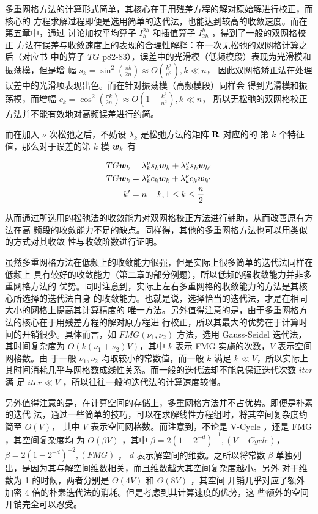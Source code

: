 \documentclass{article}
\begin{document}
多重网格方法的计算形式简单，其核心在于用残差方程的解对原始解进行校正，而核心的
方程求解过程即便是选用简单的迭代法，也能达到较高的收敛速度。而在第五章中，通过
讨论加权平均算子 $I_{h}^{2h}$ 和插值算子 $I_{2h}^{h}$ ，得到了一般的双网格校正
方法在误差与收敛速度上的表现的合理性解释：在一次无松弛的双网格计算之后（对应书
中的算子 $TG$ p82-83），误差中的光滑模（低频模段）表现为光滑模和振荡模，但是增
幅 $s_k = \sin^2 (\frac{\pi k}{2n}) \approx O(\frac{k^2}{n^2}), k \ll n$，
因此双网格矫正法在处理误差中的光滑项表现出色。而在针对振荡模（高频模段）同样会
得到光滑模和振荡模，而增幅
$c_k = \cos^2 (\frac{\pi k}{2n}) \approx O(1-\frac{k^2}{n^2}), k \ll n$，
所以无松弛的双网格校正方法并不能有效地对高频误差进行约简。

而在加入 $\nu$ 次松弛之后，不妨设 $\lambda_k$ 是松弛方法的矩阵 ${\mathbf R}$ 对应的的
第 $k$ 个特征值，那么对于误差的第 $k$ 模 ${\bm w}_k$ 有

\begin{align}
    TG {\bm w}_k & = \lambda_k^{\nu} s_k {\bm w}_k + \lambda_k^{\nu} s_k {\bm w}_{k'} \\
    TG {\bm w}_k & = \lambda_k^{\nu} c_k {\bm w}_k + \lambda_k^{\nu} c_k {\bm w}_{k'} \\
    k'        & = n - k, 1 \le k \le \frac{n}{2} \notag
\end{align}

从而通过所选用的松弛法的收敛能力对双网格校正方法进行辅助，从而改善原有方法在高
频段的收敛能力不足的缺点。同样得，其他的多重网格方法也可以用类似的方式对其收敛
性与收敛阶数进行证明。

虽然多重网格方法在低频上的收敛能力很强，但是实际上很多简单的迭代法同样在低频上
具有较好的收敛能力（第二章的部分例题），所以低频的强收敛能力并非多重网格方法的
优势。同时注意到，实际上左右多重网格的收敛能力的方法是其核心所选择的迭代法自身
的收敛能力。也就是说，选择恰当的迭代法，才是在相同大小的网格上提高其计算精度的
唯一方法。另外值得注意的是，由于多重网格方法的核心在于用残差方程的解对原方程进
行校正，所以其最大的优势在于计算时间的开销很少。具体而言，如
$FMG(\nu_1, \nu_2)$ 方法，选用 Gauss-Seidel 迭代法，其时间复杂度为
$O(k (\nu_1 + \nu_2) V)$，其中 $k$ 表示 FMG 实施的次数，$V$ 表示空间网格数。由
于一般 $\nu_1, \nu_2$ 均取较小的常数值，而一般 $k$ 满足 $k \ll V$，所以实际上
其时间消耗几乎与网格数成线性关系。而一般的迭代法却不能总保证迭代次数 $iter$ 满
足 $iter \ll V$ ，所以往往一般的迭代法的计算速度较慢。

另外值得注意的是，在计算空间的存储上，多重网格方法并不占优势。即便是朴素的迭代
法，通过一些简单的技巧，可以在求解线性方程组时，将其空间复杂度约简至 $O(V)$，
其中 $V$ 表示空间网格数。而注意到，不论是 V-Cycle ，还是 FMG ，其空间复杂度均
为 $O(\beta V)$ ，其中 $\beta = 2(1-2^{-d})^{-1}, (V-Cycle)$，
$\beta = 2(1-2^{-d})^{-2}, (FMG)$ ， $d$ 表示解空间的维数。之所以将常数
$\beta$ 单独列出，是因为其与解空间维数相关，而且维数越大其空间复杂度越小。另外
对于维数为 1 的时候，两者分别是 $\varTheta(4 V)$ 和 $\varTheta(8 V)$ ，其空间
开销几乎对应了额外加密 4 倍的朴素迭代法的消耗。但是考虑到其计算速度的优势，这
些额外的空间开销完全可以忍受。
\end{document}
